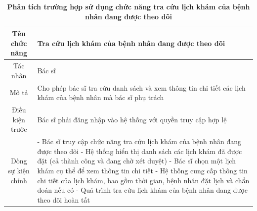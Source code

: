 \begin{table}[H]
	\caption{\bfseries \fontsize{12pt}{0pt}\selectfont Phân tích trường hợp sử dụng chức năng tra cứu lịch khám của bệnh nhân đang được theo dõi}
	\centering
	\begin{tabularx}{0.9\textwidth}{|c|X|}
		\hline
		\textbf{Tên chức năng} & \textbf{Tra cứu lịch khám của bệnh nhân đang được theo dõi}                                                 \\
		\hline
		Tác nhân               & Bác sĩ                                                                                                      \\
		\hline
		Mô tả                  & Cho phép bác sĩ tra cứu danh sách và xem thông tin chi tiết các lịch khám của bệnh nhân mà bác sĩ phụ trách \\
		\hline
		Điều kiện trước        & Bác sĩ phải đăng nhập vào hệ thống với quyền truy cập hợp lệ                                                \\
		\hline
		Dòng sự kiện chính     &
		- Bác sĩ truy cập chức năng tra cứu lịch khám của bệnh nhân đang được theo dõi \newline
		- Hệ thống hiển thị danh sách các lịch khám đã được đặt (cả thành công và đang chờ xét duyệt) \newline
		- Bác sĩ chọn một lịch khám cụ thể để xem thông tin chi tiết \newline
		- Hệ thống cung cấp thông tin chi tiết của lịch khám, bao gồm thời gian, bệnh nhân đặt lịch và chẩn đoán nếu có \newline
		- Quá trình tra cứu lịch khám của bệnh nhân đang được theo dõi hoàn tất                                                              \\
		\hline
	\end{tabularx}
\end{table}

